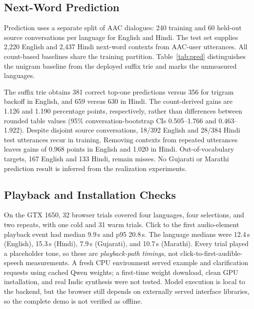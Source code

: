 

\subsection{Next-Word Prediction}
Prediction uses a separate split of AAC dialogues: 240 training and 60 held-out source conversations per language for English and Hindi.
The test set supplies 2,220 English and 2,437 Hindi next-word contexts from AAC-user utterances.
All count-based baselines share the training partition.
Table~\ref{tab:pred} distinguishes the unigram baseline from the deployed suffix trie and marks the unmeasured languages.

The suffix trie obtains 381 correct top-one predictions versus 356 for trigram backoff in English, and 659 versus 630 in Hindi.
The count-derived gains are 1.126 and 1.190 percentage points, respectively, rather than differences between rounded table values (95\% conversation-bootstrap CIs 0.505--1.766 and 0.463--1.922).
Despite disjoint source conversations, 18/392 English and 28/384 Hindi test utterances recur in training.
Removing contexts from repeated utterances leaves gains of 0.968 points in English and 1.020 in Hindi.
Out-of-vocabulary targets, 167 English and 133 Hindi, remain misses.
No Gujarati or Marathi prediction result is inferred from the realization experiments.

\subsection{Playback and Installation Checks}
On the GTX 1650, 32 browser trials covered four languages, four selections, and two repeats, with one cold and 31 warm trials.
Click to the first audio-element playback event had median 9.9\,s and p95 20.8\,s.
The language medians were 12.4\,s (English), 15.3\,s (Hindi), 7.9\,s (Gujarati), and 10.7\,s (Marathi).
Every trial played a placeholder tone, so these are \emph{playback-path timings}, not click-to-first-audible-speech measurements.
A fresh CPU environment served example and clarification requests using cached Qwen weights; a first-time weight download, clean GPU installation, and real Indic synthesis were not tested.
Model execution is local to the backend, but the browser still depends on externally served interface libraries, so the complete demo is not verified as offline.
